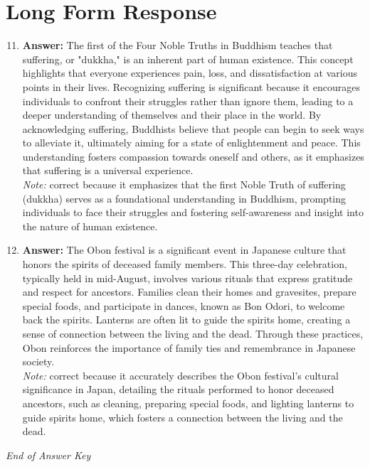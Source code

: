 \documentclass[12pt]{article}
\begin{document}
\section*{Long Form Response}
\begin{enumerate}[label=\arabic*.]
\setcounter{enumi}{10}
\item \textbf{Answer:} The first of the Four Noble Truths in Buddhism teaches that suffering, or "dukkha," is an inherent part of human existence. This concept highlights that everyone experiences pain, loss, and dissatisfaction at various points in their lives. Recognizing suffering is significant because it encourages individuals to confront their struggles rather than ignore them, leading to a deeper understanding of themselves and their place in the world. By acknowledging suffering, Buddhists believe that people can begin to seek ways to alleviate it, ultimately aiming for a state of enlightenment and peace. This understanding fosters compassion towards oneself and others, as it emphasizes that suffering is a universal experience.
\\ \textit{Note:} correct because it emphasizes that the first Noble Truth of suffering (dukkha) serves as a foundational understanding in Buddhism, prompting individuals to face their struggles and fostering self-awareness and insight into the nature of human existence.
\item \textbf{Answer:} The Obon festival is a significant event in Japanese culture that honors the spirits of deceased family members. This three-day celebration, typically held in mid-August, involves various rituals that express gratitude and respect for ancestors. Families clean their homes and gravesites, prepare special foods, and participate in dances, known as Bon Odori, to welcome back the spirits. Lanterns are often lit to guide the spirits home, creating a sense of connection between the living and the dead. Through these practices, Obon reinforces the importance of family ties and remembrance in Japanese society.
\\ \textit{Note:} correct because it accurately describes the Obon festival's cultural significance in Japan, detailing the rituals performed to honor deceased ancestors, such as cleaning, preparing special foods, and lighting lanterns to guide spirits home, which fosters a connection between the living and the dead.
\end{enumerate}

\vfill
\noindent\textit{End of Answer Key}
\end{document}
